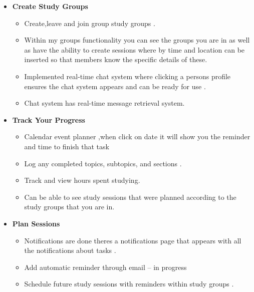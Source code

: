 \begin{itemize}
    \item \textbf{Create Study Groups} 
    \begin{itemize}
        \item Create,leave and join group study groups .
        \item Within my groups functionality  you can see the groups you are in as well as have the ability to create sessions where by time and location can be inserted so that members know the specific details of these. 
        \item Implemented real-time chat system where clicking a persons profile ensures the chat system appears and can be ready for use .
        \item Chat system has real-time message retrieval system.
    \end{itemize}

    \item \textbf{Track Your Progress} 
    \begin{itemize}
        \item Calendar event planner ,when click on date it will show you the reminder and time to finish that task
        \item Log any completed topics, subtopics, and sections .
        \item Track and view hours spent studying.
        \item Can be able to see study sessions that were planned according to the study groups that you are in.
    \end{itemize}

    \item \textbf{Plan Sessions} 
    \begin{itemize}
        \item Notifications are done theres a notifications page that appears with all the notifications about tasks .
        \item Add automatic reminder through email -- in progress
        \item Schedule future study sessions with reminders within study groups .
    \end{itemize}
\end{itemize}
